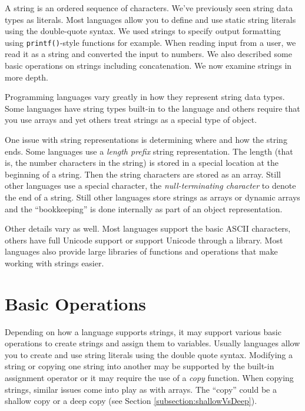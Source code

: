 

A \gls{string} is an ordered sequence of characters.
We've previously seen string data types as literals.  Most 
languages allow you to define and use static string literals
using the double-quote syntax.  We used strings to specify
output formatting using \texttt{printf()}-style functions
for example.  When reading input from a user, we read it
as a string and converted the input to numbers.  We also
described some basic operations on strings including 
concatenation.  We now examine strings in more depth.  

Programming languages vary greatly in how they represent
string data types.  Some languages have string types
built-in to the language and others require that you use
arrays and yet others treat strings as a special type of
object.  

One issue with string representations is determining where
and how the string ends.  Some languages use a \emph{length
prefix} string representation.  The length (that is, the number
characters in the string) is stored in a special location at
the beginning of a string.  Then the string characters are
stored as an array.  Still other languages use a special
character, the \emph{null-terminating character} to denote
the end of a string.  Still other languages store strings
as arrays or dynamic arrays and the ``bookkeeping''
is done internally as part of an object representation.

Other details vary as well.  Most languages support the
basic ASCII characters, others have full Unicode support
or support Unicode through a library.  Most languages
also provide large libraries of functions and operations
that make working with strings easier.

\section{Basic Operations}

Depending on how a language supports strings, it may
support various basic operations to create strings and
assign them to variables.  Usually languages allow you
to create and use string literals using the double quote 
syntax.  Modifying a string or copying one string into 
another may be supported by the built-in assignment
operator or it may require the use of a \emph{copy}
function.  When copying strings, similar issues come 
into play as with arrays.  The ``copy'' could be a shallow
copy or a deep copy (see Section \ref{subsection:shallowVsDeep}).

